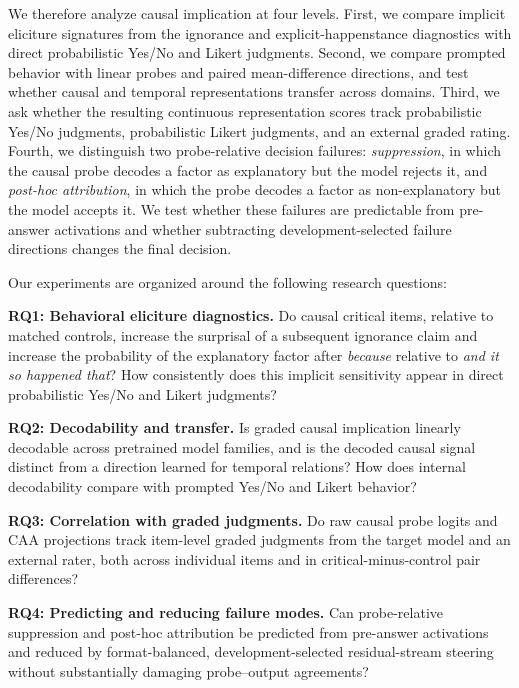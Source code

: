 We therefore analyze causal implication at four levels. First, we compare implicit eliciture signatures from the ignorance and explicit-happenstance diagnostics with direct probabilistic Yes/No and Likert judgments. Second, we compare prompted behavior with linear probes and paired mean-difference directions, and test whether causal and temporal representations transfer across domains. Third, we ask whether the resulting continuous representation scores track probabilistic Yes/No judgments, probabilistic Likert judgments, and an external graded rating. Fourth, we distinguish two probe-relative decision failures: \emph{suppression}, in which the causal probe decodes a factor as explanatory but the model rejects it, and \emph{post-hoc attribution}, in which the probe decodes a factor as non-explanatory but the model accepts it. We test whether these failures are predictable from pre-answer activations and whether subtracting development-selected failure directions changes the final decision.

Our experiments are organized around the following research questions:

\begin{samepage}
\noindent\textbf{RQ1: Behavioral eliciture diagnostics.} Do causal critical items, relative to matched controls, increase the surprisal of a subsequent ignorance claim and increase the probability of the explanatory factor after \emph{because} relative to \emph{and it so happened that}? How consistently does this implicit sensitivity appear in direct probabilistic Yes/No and Likert judgments?
\end{samepage}

\begin{samepage}
\noindent\textbf{RQ2: Decodability and transfer.} Is graded causal implication linearly decodable across pretrained model families, and is the decoded causal signal distinct from a direction learned for temporal relations? How does internal decodability compare with prompted Yes/No and Likert behavior?
\end{samepage}

\begin{samepage}
\noindent\textbf{RQ3: Correlation with graded judgments.} Do raw causal probe logits and CAA projections track item-level graded judgments from the target model and an external rater, both across individual items and in critical-minus-control pair differences?
\end{samepage}

\begin{samepage}
\noindent\textbf{RQ4: Predicting and reducing failure modes.} Can probe-relative suppression and post-hoc attribution be predicted from pre-answer activations and reduced by format-balanced, development-selected residual-stream steering without substantially damaging probe--output agreements?
\end{samepage}
